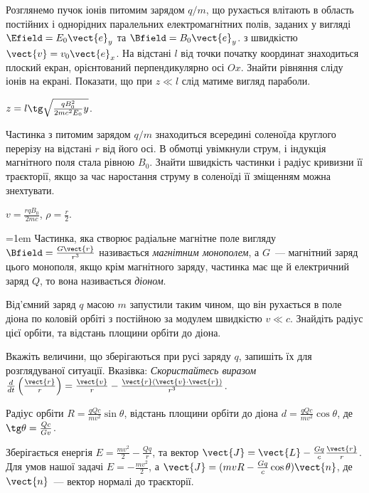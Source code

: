 \begin{problem}
Розглянемо пучок іонів питомим зарядом $q/m$, що рухається влітають в область постійних і однорідних паралельних електромагнітних полів, заданих у вигляді $\Efield = E_0\vect{e}_y$ та $\Bfield = B_0\vect{e}_y$. з швидкістю $\vect{v} = v_0 \vect{e}_x$. На відстані $l$ від точки початку координат знаходиться плоский екран, орієнтований перпендикулярно осі $Ox$. Знайти рівняння сліду іонів на екрані. Показати, що при $z \ll l$ слід матиме вигляд параболи.
\begin{solution}
	$z = l\tg\sqrt{\frac{qB_0^2}{2mc^2E_0}y}$.
\end{solution}
\end{problem}


\begin{problem}
Частинка з питомим зарядом $q/m$ знаходиться всередині соленоїда круглого перерізу на відстані $r$ від його осі. В обмотці увімкнули струм, і індукція магнітного поля стала рівною $B_0$. Знайти швидкість частинки і радіус кривизни її траєкторії, якщо за час наростання струму в соленоїді її зміщенням можна знехтувати.
\begin{solution}
	$v = \frac{rqB_0}{2mc}$, $\rho = \frac{r}{2}$.
\end{solution}
\end{problem}

\begin{problem}
\parindent=1em%
    Частинка, яка створює радіальне магнітне поле вигляду $\Bfield = \frac{G\vect{r}}{r^3}$ називається \emph{магнітним монополем}, а $G$~--- магнітний заряд цього монополя, якщо крім магнітного заряду,  частинка має ще й електричний заряд $Q$, то вона називається \emph{діоном}.

	Від'ємний заряд $q$ масою $m$ запустили таким чином, що він рухається в поле діона по коловій орбіті з постійною за модулем швидкістю $v \ll c$. Знайдіть радіус цієї орбіти, та відстань площини орбіти до діона.

	Вкажіть величини, що зберігаються при русі заряду $q$, запишіть їх для розглядуваної ситуації. Вказівка: \emph{Скористайтесь виразом $\frac{d}{dt}\left( \frac{\vect{r}}{r}\right)  = \frac{\vect{v}}{r} - \frac{\vect{r}(\vect{v}\cdot\vect{r})}{r^3}$}.
\begin{solution}
	Радіус орбіти $R = \frac{qQc}{mv^2}\sin\theta$, відстань площини орбіти до діона $d = \frac{qQc}{mv^2}\cos\theta$, де $\tg\theta = \frac{Q c}{G v}$.

	Зберігається енергія $E = \frac{mv^2}{2} - \frac{Qq}{r}$, та вектор $\vect{J} = \vect{L} - \frac{Gq}{c}\frac{\vect{r}}{r} $. Для умов нашої задачі $E = -\frac{mv^2}{2}$, а $\vect{J} = (mvR - \frac{Gq}{c}\cos\theta) \vect{n} $, де $\vect{n}$~--- вектор нормалі до траєкторії.
\end{solution}
\end{problem}



